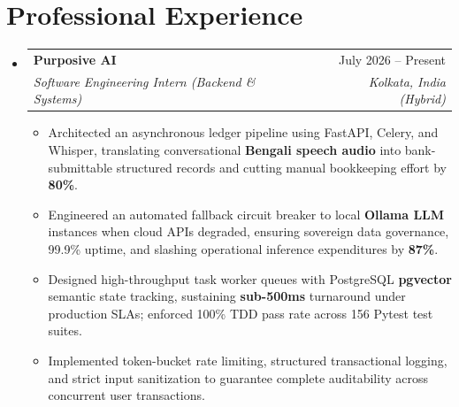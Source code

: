 \documentclass[letterpaper,10pt]{article}
\makeatletter
\newcommand{\resumeItem}[1]{
  \item\small{
    {#1 \vspace{-2pt}}
  }
}
\newcommand{\resumeSubheading}[4]{
  \vspace{-1pt}\item
    \begin{tabular*}{0.97\textwidth}[t]{l@{\extracolsep{\fill}}r}
      \textbf{#1} & #2 \\
      \textit{\small#3} & \textit{\small #4} \\
    \end{tabular*}\vspace{-5pt}
}
\newcommand{\resumeSubHeadingListStart}{\begin{itemize}[leftmargin=0.15in, label={}]}
\newcommand{\resumeSubHeadingListEnd}{\end{itemize}}
\newcommand{\resumeItemListStart}{\begin{itemize}[leftmargin=0.15in]}
\newcommand{\resumeItemListEnd}{\end{itemize}\vspace{-4pt}}
\makeatother
\begin{document}
\section{Professional Experience}
  \resumeSubHeadingListStart

    \resumeSubheading
      {Purposive AI}{July 2026 -- Present}
      {Software Engineering Intern (Backend \& Systems)}{Kolkata, India (Hybrid)}
      \resumeItemListStart
        \resumeItem{Architected an asynchronous ledger pipeline using FastAPI, Celery, and Whisper, translating conversational \textbf{Bengali speech audio} into bank-submittable structured records and cutting manual bookkeeping effort by \textbf{80\%}.}
        \resumeItem{Engineered an automated fallback circuit breaker to local \textbf{Ollama LLM} instances when cloud APIs degraded, ensuring sovereign data governance, 99.9\% uptime, and slashing operational inference expenditures by \textbf{87\%}.}
        \resumeItem{Designed high-throughput task worker queues with PostgreSQL \textbf{pgvector} semantic state tracking, sustaining \textbf{sub-500ms} turnaround under production SLAs; enforced 100\% TDD pass rate across 156 Pytest test suites.}
        \resumeItem{Implemented token-bucket rate limiting, structured transactional logging, and strict input sanitization to guarantee complete auditability across concurrent user transactions.}
      \resumeItemListEnd

  \resumeSubHeadingListEnd

\end{document}
